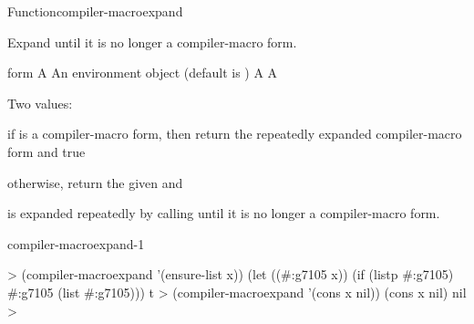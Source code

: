 \documentclass[10pt,twoside,english,pdftex]{article}
\begin{document}
\begin{functiondoc}{Function}{compiler-macroexpand}{%
       
    \mbox{\returns{} }}
%
%
  
\fnsyntax

\fnpurpose Expand  until it is no longer a compiler-macro form.

\fnpackage {}

\fnmodule {}

\fnargs
\begin{args}{form}
\arg[form] A 
\arg[env] An environment object (default is \nil)
\arg[expansion] A 
\arg[expanded-p] A 
\end{args}

\fnreturns
Two values:
\begin{tightitemize}
\item if  is a compiler-macro form, then return the 
  repeatedly expanded compiler-macro form and true
\item otherwise, return the given  and \nil{}
\end{tightitemize}

\fndescription
%
 is expanded repeatedly by calling
\textbf{} until it is no longer a
compiler-macro form.

\begin{alsos}{compiler-macroexpand-1}
\end{alsos}

\fnexamples
%
\W\supp
\begin{example}
  > (compiler-macroexpand '(ensure-list x))
  (let ((#:g7105 x)) (if (listp #:g7105) #:g7105 (list #:g7105)))
  t
  > (compiler-macroexpand '(cons x nil))
  (cons x nil)
  nil
  >
\end{example}

\end{functiondoc}

\end{document}
